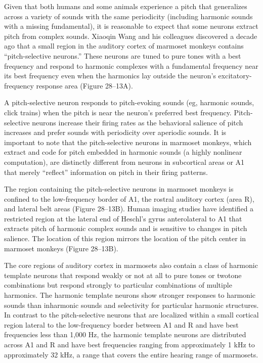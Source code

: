 \documentclass[journal]{IEEEtran}
\begin{document}
Given that both humans and some animals experience a pitch that generalizes across a variety of sounds with the same periodicity (including harmonic sounds with a missing fundamental), it is reasonable to expect that some neurons extract pitch from complex sounds. 
Xiaoqin Wang and his colleagues discovered a decade ago that a small region in the auditory cortex of marmoset monkeys contains “pitch-selective neurons.”
These neurons are tuned to pure tones with a best frequency and respond to harmonic complexes with a fundamental frequency near its best frequency even when the harmonics lay outside the neuron’s excitatory-frequency response area (Figure 28–13A).


A pitch-selective neuron responds to pitch-evoking sounds (eg, harmonic sounds, click trains) when the pitch is near the neuron’s preferred best frequency.
Pitch-selective neurons increase their firing rates as the behavioral salience of pitch increases and prefer sounds with periodicity over aperiodic sounds.
It is important to note that the pitch-selective neurons in marmoset monkeys, which extract and code for pitch embedded in harmonic sounds (a highly nonlinear computation), are distinctly different from neurons in subcortical areas or A1 that merely “reflect” information on pitch in their firing patterns.


The region containing the pitch-selective neurons in marmoset monkeys is confined to the low-frequency border of A1, the rostral auditory cortex (area R), and lateral belt areas (Figure 28–13B).
Human imaging studies have identified a restricted region at the lateral end of Heschl’s gyrus anterolateral to A1 that extracts pitch of harmonic complex sounds and is sensitive to changes in pitch salience.
The location of this region mirrors the location of the pitch center in marmoset monkeys (Figure 28–13B).


The core regions of auditory cortex in marmosets also contain a class of harmonic template neurons that respond weakly or not at all to pure tones or twotone combinations but respond strongly to particular combinations of multiple harmonics.
The harmonic template neurons show stronger responses to harmonic sounds than inharmonic sounds and selectivity for particular harmonic structures.
In contrast to the pitch-selective neurons that are localized within a small cortical region lateral to the low-frequency border between A1 and R and have best frequencies less than 1,000 Hz, the harmonic template neurons are distributed across A1 and R and have best frequencies ranging from approximately 1 kHz to approximately 32 kHz, a range that covers the entire hearing range of marmosets.
\end{document}
